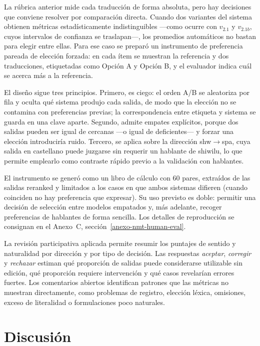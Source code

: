 \documentclass[12pt,a4paper,oneside]{book}
\begin{document}
La rúbrica anterior mide cada traducción de forma absoluta, pero hay decisiones que conviene resolver por comparación directa. Cuando dos variantes del sistema obtienen métricas estadísticamente indistinguibles —como ocurre con \(v_{2.1}\) y \(v_{2.1b}\), cuyos intervalos de confianza se traslapan—, los promedios automáticos no bastan para elegir entre ellas. Para ese caso se preparó un instrumento de preferencia pareada de elección forzada: en cada ítem se muestran la referencia y dos traducciones, etiquetadas como Opción A y Opción B, y el evaluador indica cuál se acerca más a la referencia.

El diseño sigue tres principios. Primero, es ciego: el orden A/B se aleatoriza por fila y oculta qué sistema produjo cada salida, de modo que la elección no se contamina con preferencias previas; la correspondencia entre etiqueta y sistema se guarda en una clave aparte. Segundo, admite empates explícitos, porque dos salidas pueden ser igual de cercanas —o igual de deficientes— y forzar una elección introduciría ruido. Tercero, se aplica sobre la dirección shw\(\rightarrow\)spa, cuya salida en castellano puede juzgarse sin requerir un hablante de shiwilu, lo que permite emplearlo como contraste rápido previo a la validación con hablantes.

El instrumento se generó como un libro de cálculo con 60 pares, extraídos de las salidas reranked y limitados a los casos en que ambos sistemas difieren (cuando coinciden no hay preferencia que expresar). Su uso previsto es doble: permitir una decisión de selección entre modelos empatados y, más adelante, recoger preferencias de hablantes de forma sencilla. Los detalles de reproducción se consignan en el Anexo~C, sección~\ref{anexo-nmt-human-eval}.

La revisión participativa aplicada permite resumir los puntajes de sentido y naturalidad por dirección y por tipo de decisión. Las respuestas \emph{aceptar}, \emph{corregir} y \emph{rechazar} estiman qué proporción de salidas puede considerarse utilizable sin edición, qué proporción requiere intervención y qué casos revelarían errores fuertes. Los comentarios abiertos identifican patrones que las métricas no muestran directamente, como problemas de registro, elección léxica, omisiones, exceso de literalidad o formulaciones poco naturales.

\section{Discusión}\label{protocolo-discusion}
\end{document}
